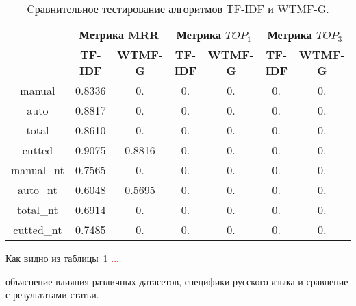     \begin{table}[ht!]
    \caption{Cравнительное тестирование алгоритмов TF-IDF и WTMF-G. \bigskip}
    \centering

    \label{tabular:tfidf_wmtfg}
        \begin{tabular}{|c|c|c|c|c|c|c|}
            \hline
            \bf{\multirow{2}{*}{\specialcell{Набор данных}}} &
            \multicolumn{2}{|c|}{\bf{Метрика MRR}} &
            \multicolumn{2}{|c|}{\bf{Метрика $TOP_1$}} &
            \multicolumn{2}{|c|}{\bf{Метрика $TOP_3$}} \\ \cline{2-7}
            & \bf{TF-IDF} & \bf{WTMF-G} & \bf{TF-IDF} & \bf{WTMF-G} & \bf{TF-IDF} & \bf{WTMF-G} \\ \hline
            manual & 0.8336 & 0. & 0. & 0. & 0. & 0. \\ \hline
            auto & 0.8817 & 0. & 0. & 0. & 0. & 0. \\ \hline
            total & 0.8610 & 0. & 0. & 0. & 0. & 0. \\ \hline
            cutted & 0.9075 & 0.8816 & 0. & 0. & 0. & 0. \\ \hline
            manual\_nt & 0.7565 & 0. & 0. & 0. & 0. & 0. \\ \hline
            auto\_nt & 0.6048 & 0.5695 & 0. & 0. & 0. & 0. \\ \hline
            total\_nt & 0.6914 & 0. & 0. & 0. & 0. & 0. \\ \hline
            cutted\_nt & 0.7485 & 0. & 0. & 0. & 0. & 0. \\ \hline
        \end{tabular}
    \end{table}
    Как видно из таблицы~\ref{tabular:tfidf_wmtfg} \textcolor{red}{...}

    объяснение влияния различных датасетов, специфики русского языка и сравнение с результатами статьи.
